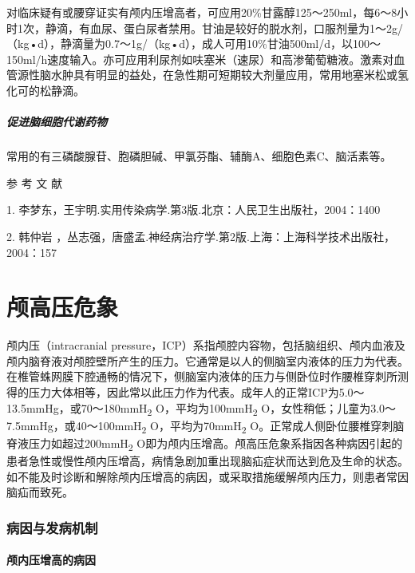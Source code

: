 对临床疑有或腰穿证实有颅内压增高者，可应用20\%甘露醇125～250ml，每6～8小时1次，静滴，有血尿、蛋白尿者禁用。甘油是较好的脱水剂，口服剂量为1～2g/（kg•d），静滴量为0.7～1g/（kg•d），成人可用10\%甘油500ml/d，以100～150ml/h速度输入。亦可应用利尿剂如呋塞米（速尿）和高渗葡萄糖液。激素对血管源性脑水肿具有明显的益处，在急性期可短期较大剂量应用，常用地塞米松或氢化可的松静滴。

\paragraph{促进脑细胞代谢药物}

常用的有三磷酸腺苷、胞磷胆碱、甲氯芬酯、辅酶A、细胞色素C、脑活素等。
\protect\hypertarget{text00106.html}{}{}

\hypertarget{text00106.htmlux5cux23CHP4-5-4}{}
参 考 文 献

1. 李梦东，王宇明.实用传染病学.第3版.北京：人民卫生出版社，2004：1400

2. 韩仲岩
，丛志强，唐盛孟.神经病治疗学.第2版.上海：上海科学技术出版社，2004：157

\protect\hypertarget{text00107.html}{}{}

\chapter{颅高压危象}

颅内压（intracranial
pressure，ICP）系指颅腔内容物，包括脑组织、颅内血液及颅内脑脊液对颅腔壁所产生的压力。它通常是以人的侧脑室内液体的压力为代表。在椎管蛛网膜下腔通畅的情况下，侧脑室内液体的压力与侧卧位时作腰椎穿刺所测得的压力大体相等，因此常以此压力作为代表。成年人的正常ICP为5.0～13.5mmHg，或70～180mmH\textsubscript{2}
O，平均为100mmH\textsubscript{2}
O，女性稍低；儿童为3.0～7.5mmHg，或40～100mmH\textsubscript{2}
O，平均为70mmH\textsubscript{2}
O。正常成人侧卧位腰椎穿刺脑脊液压力如超过200mmH\textsubscript{2}
O即为颅内压增高。颅高压危象系指因各种病因引起的患者急性或慢性颅内压增高，病情急剧加重出现脑疝症状而达到危及生命的状态。如不能及时诊断和解除颅内压增高的病因，或采取措施缓解颅内压力，则患者常因脑疝而致死。

\subsection{病因与发病机制}

\subsubsection{颅内压增高的病因}

